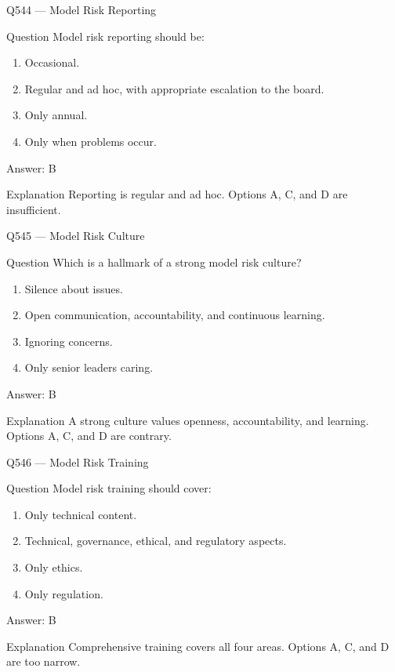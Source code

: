 \documentclass[aspectratio=169,8pt]{beamer}
\begin{document}
	\begin{frame}{Q544 --- Model Risk Reporting}
		\begin{block}{Question}
			Model risk reporting should be:
			\begin{enumerate}
				\item Occasional.
				\item Regular and ad hoc, with appropriate escalation to the board.
				\item Only annual.
				\item Only when problems occur.
			\end{enumerate}
		\end{block}
		\begin{exampleblock}{Answer: B}\end{exampleblock}
		\begin{block}{Explanation}
			Reporting is regular and ad hoc. Options A, C, and D are insufficient.
		\end{block}
	\end{frame}
	
	\begin{frame}{Q545 --- Model Risk Culture}
		\begin{block}{Question}
			Which is a hallmark of a strong model risk culture?
			\begin{enumerate}
				\item Silence about issues.
				\item Open communication, accountability, and continuous learning.
				\item Ignoring concerns.
				\item Only senior leaders caring.
			\end{enumerate}
		\end{block}
		\begin{exampleblock}{Answer: B}\end{exampleblock}
		\begin{block}{Explanation}
			A strong culture values openness, accountability, and learning. Options A, C, and D are contrary.
		\end{block}
	\end{frame}
	
	\begin{frame}{Q546 --- Model Risk Training}
		\begin{block}{Question}
			Model risk training should cover:
			\begin{enumerate}
				\item Only technical content.
				\item Technical, governance, ethical, and regulatory aspects.
				\item Only ethics.
				\item Only regulation.
			\end{enumerate}
		\end{block}
		\begin{exampleblock}{Answer: B}\end{exampleblock}
		\begin{block}{Explanation}
			Comprehensive training covers all four areas. Options A, C, and D are too narrow.
		\end{block}
	\end{frame}
	
\end{document}
